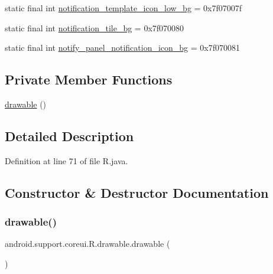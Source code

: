 \begin{DoxyCompactItemize}
\item 
static final int \mbox{\hyperlink{classandroid_1_1support_1_1coreui_1_1_r_1_1drawable_a6aa5ebe8043d2f7155705c4988e46024}{notification\+\_\+template\+\_\+icon\+\_\+low\+\_\+bg}} = 0x7f07007f
\item 
static final int \mbox{\hyperlink{classandroid_1_1support_1_1coreui_1_1_r_1_1drawable_aa40d9d7403b9046f03181c7e8fa6b217}{notification\+\_\+tile\+\_\+bg}} = 0x7f070080
\item 
static final int \mbox{\hyperlink{classandroid_1_1support_1_1coreui_1_1_r_1_1drawable_a8fad725edb38a205968e9df2ec8754fc}{notify\+\_\+panel\+\_\+notification\+\_\+icon\+\_\+bg}} = 0x7f070081
\end{DoxyCompactItemize}
\subsection*{Private Member Functions}
\begin{DoxyCompactItemize}
\item 
\mbox{\hyperlink{classandroid_1_1support_1_1coreui_1_1_r_1_1drawable_a237196404e1e1cdbc494a627d070e74b}{drawable}} ()
\end{DoxyCompactItemize}


\subsection{Detailed Description}


Definition at line 71 of file R.\+java.



\subsection{Constructor \& Destructor Documentation}
\mbox{\label{classandroid_1_1support_1_1coreui_1_1_r_1_1drawable_a237196404e1e1cdbc494a627d070e74b}} 
\subsubsection{\texorpdfstring{drawable()}{drawable()}}
{\footnotesize\ttfamily android.\+support.\+coreui.\+R.\+drawable.\+drawable (\begin{DoxyParamCaption}{ }\end{DoxyParamCaption})\hspace{0.3cm}{\ttfamily [private]}}



